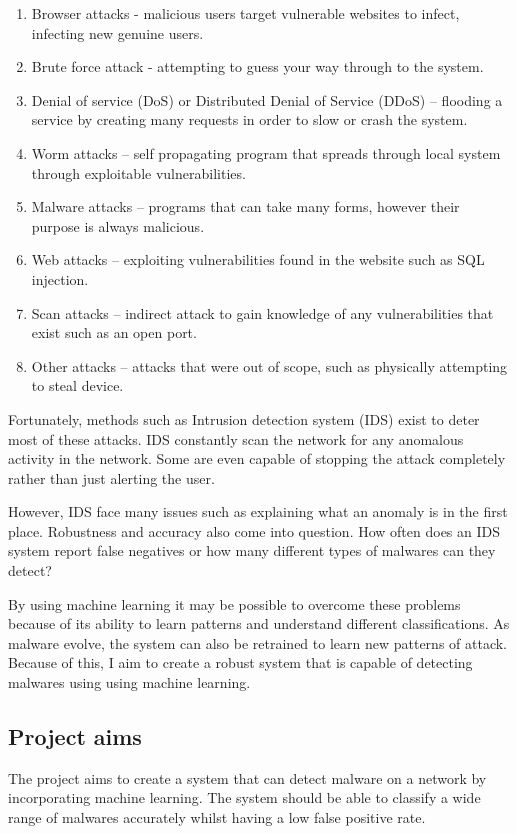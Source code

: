 \documentclass[11pt]{article}
\begin{document}
\begin{enumerate}
  \item Browser attacks - malicious users target vulnerable websites to infect, infecting new genuine users. 
  \item Brute force attack - attempting to guess your way through to the system. 
  \item Denial of service (DoS) or Distributed Denial of Service (DDoS) – flooding a service by creating many requests in order to slow or crash the system.
  \item Worm attacks – self propagating program that spreads through local system through exploitable vulnerabilities.
  \item Malware attacks – programs that can take many forms, however their purpose is always malicious.
  \item Web attacks – exploiting vulnerabilities found in the website such as SQL injection.
  \item Scan attacks – indirect attack to gain knowledge of any vulnerabilities that exist such as an open port. 
  \item Other attacks – attacks that were out of scope, such as physically attempting to steal device.
\end{enumerate}

Fortunately, methods such as Intrusion detection system (IDS) exist to deter most of these attacks. IDS constantly scan the network for any anomalous activity in the network. Some are even capable of stopping the attack completely rather than just alerting the user. 

However, IDS face many issues such as explaining what an anomaly is in the first place. Robustness and accuracy also come into question. How often does an IDS system report false negatives or how many different types of malwares can they detect? 

By using machine learning it may be possible to overcome these problems because of its ability to learn patterns and understand different classifications. As malware evolve, the system can also be retrained to learn new patterns of attack. Because of this, I aim to create a robust system that is capable of detecting malwares using using machine learning.

\subsection{Project aims}
The project aims to create a system that can detect malware on a network by incorporating machine learning. The system should be able to classify a wide range of malwares accurately whilst having a low false positive rate. 
\end{document}
